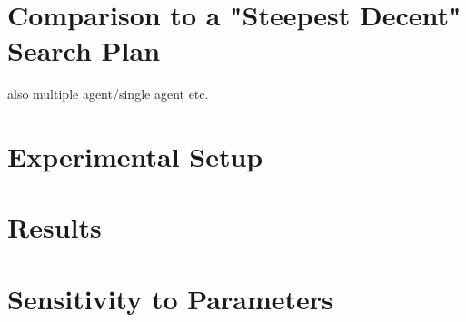 \documentclass[12pt, letterpaper]{article}  %
\theoremstyle{definition}
\theoremstyle{remark}
\theoremstyle{plain}
\begin{document}

\section{Comparison to a "Steepest Decent" Search Plan}\label{sec:greedyalg}




also multiple agent/single agent etc.





\section{Experimental Setup}\label{sec:experiment}



\section{Results}\label{sec:results}










\section{Sensitivity to Parameters}\label{sec:sensitive}
\end{document}

